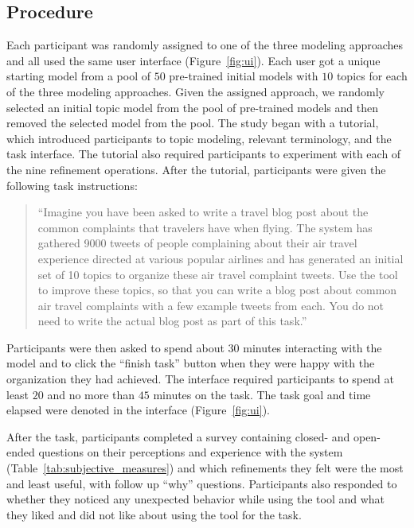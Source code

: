 \subsection{Procedure}
\label{sec:procedure}
Each participant was randomly assigned to one of the three
modeling approaches and all used the same \hltm{}
user interface (Figure~\ref{fig:ui}). 
Each user got a unique starting model from a pool of $50$ pre-trained initial \lda{} models with $10$
topics for each of the three \hltm{} modeling approaches. 
Given the assigned approach, we randomly selected an initial topic model from the pool
of pre-trained models and then removed the selected model from the
pool. 
The study began with a tutorial, which introduced participants to topic modeling, relevant terminology, and the task interface. The tutorial also required participants to experiment with each of the nine refinement operations. 
After the tutorial, participants were given the following task instructions: 
\begin{quote}
    ``Imagine you have been asked to write a travel blog post about the common complaints that travelers have when flying. The system has gathered 9000 tweets of people complaining about their air travel experience directed at various popular airlines and has generated an initial set of 10 topics to organize these air travel complaint tweets. Use the tool to improve these topics, so that you can write a blog post about common air travel complaints with a few example tweets from each. You do not need to write the actual blog post as part of this task.''
\end{quote}

Participants were then asked to spend about
$30$ minutes interacting with the model and to click the ``finish task'' button when they
were happy with the organization they had achieved. 
The interface required participants to spend at least $20$ and no more
than $45$ minutes on the task. 
The task goal and time elapsed were denoted in the interface
(Figure~\ref{fig:ui}).

After the task, participants completed a survey containing closed- and
open-ended questions on their perceptions and experience with the
system (Table~\ref{tab:subjective_measures}) and which refinements
they felt were the most and least useful, with follow up ``why''
questions. Participants also responded to whether they noticed any
unexpected behavior while using the tool and what they liked and did
not like about using the tool for the task.

